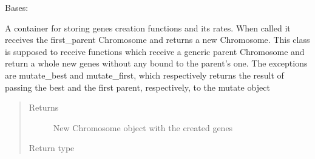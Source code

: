 \documentclass[letterpaper,10pt,english]{sphinxmanual}
\begin{document}
\begin{fulllineitems}
\label{\detokenize{MolOpt.genetic:MolOpt.genetic.genetic.Create}}
\sphinxAtStartPar
Bases: 

\sphinxAtStartPar
A container for storing genes creation functions and its rates. When called it receives the first\_parent 
Chromosome and returns a new Chromosome. This class is supposed to receive functions which receive a generic parent 
Chromosome and return a whole new genes without any bound to the parent’s one. The exceptions are mutate\_best and 
mutate\_first, which respectively returns the result of passing the best and the first parent, respectively, to the 
mutate object
\begin{quote}\begin{description}
\item[{Returns}] \leavevmode
\sphinxAtStartPar
New Chromosome object with the created genes

\item[{Return type}] \leavevmode
\sphinxAtStartPar
{\hyperref[\detokenize{MolOpt.genetic:MolOpt.genetic.genetic.Chromosome}]{}}

\end{description}\end{quote}

\end{fulllineitems}

\end{document}
